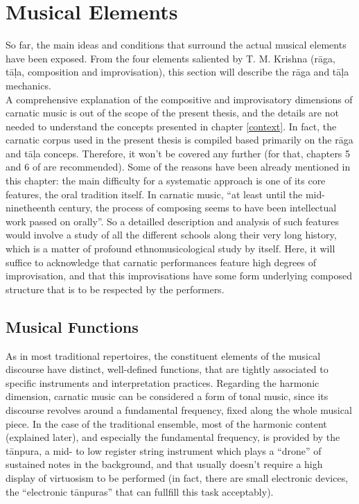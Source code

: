 \section{Musical Elements}

So far, the main ideas and conditions that surround the actual musical elements have been exposed. From the four elements saliented by T. M. Krishna (r\=aga, t\=a\d{l}a, composition and improvisation), this section will describe the r\=aga and t\=a\d{l}a mechanics.\\

A comprehensive explanation of the compositive and improvisatory dimensions of carnatic music is out of the scope of the present thesis, and the details are not needed to understand the concepts presented in chapter \ref{context}. In fact, the carnatic corpus used in the present thesis is compiled based primarily on the r\=aga and t\=a\d{l}a conceps\cite[p.64]{gulati}. Therefore, it won't be covered any further (for that, chapters 5 and 6 of \cite{krishna} are recommended). Some of the reasons have been already mentioned in this chapter: the main difficulty for a systematic approach is one of its core features, the oral tradition itself. In carnatic music, ``at least until the mid-ninetheenth century, the process of composing seems to have been intellectual work passed on orally''\cite[p.72]{krishna}. So a detailled description and analysis of such features would involve a study of all the different schools along their very long history, which is a matter of profound ethnomusicological study by itself. Here, it will suffice to acknowledge that carnatic performances feature high degrees of improvisation, and that this improvisations have some form underlying composed structure that is to be respected by the performers.\\


\subsection{Musical Functions}

As in most traditional repertoires, the constituent elements of the musical discourse have distinct, well-defined functions, that are tightly associated to specific instruments and interpretation practices. Regarding the harmonic dimension, carnatic music can be considered a form of tonal music, since its discourse revolves around a fundamental frequency, fixed along the whole musical piece. In the case of the traditional ensemble, most of the harmonic content (explained later), and especially the fundamental frequency, is provided by the t\=anpura, a mid- to low register string instrument which plays a ``drone'' of sustained notes in the background, and that usually doesn't require a high display of virtuosism to be performed (in fact, there are small electronic devices, the ``electronic t\=anpuras'' that can fullfill this task acceptably).\\

